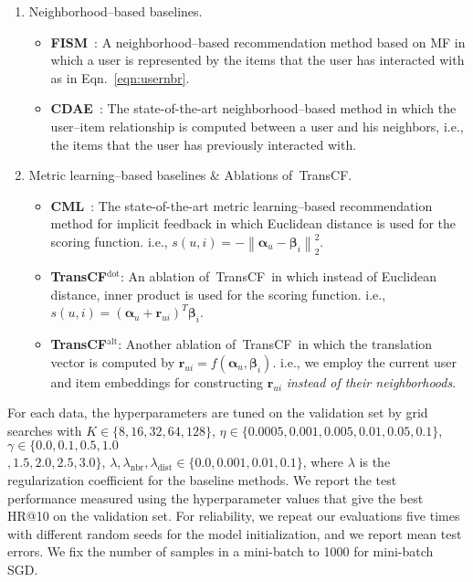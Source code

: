 \documentclass[conference]{IEEEtran}
\newcommand{\norm}[1]{\left\lVert#1\right\rVert}
\newcommand{\propose}{\textsf{{TransCF}}}
\newcommand{\proposealt}{\propose$^{\mathrm{alt}}$}
\newcommand{\proposedot}{\propose$^{\mathrm{dot}}$}
\begin{document}
\begin{enumerate}[leftmargin=0.5cm]
	\item Neighborhood--based baselines.
	\begin{itemize}
		\item \textbf{FISM}~\cite{kabbur2013fism}: A neighborhood--based recommendation method based on MF in which a user is represented by the items that the user has interacted with as in Eqn.~\ref{eqn:usernbr}.
		\item \textbf{CDAE}~\cite{wu2016collaborative}: The state-of-the-art neighborhood--based method in which the user--item relationship is computed between a user and his neighbors, i.e., the items that the user has previously interacted with.
	\end{itemize}
	\item Metric learning--based baselines \& Ablations of~\propose.
	\begin{itemize}
		\item \textbf{CML}~\cite{hsieh2017collaborative}: The state-of-the-art metric learning--based recommendation method for implicit feedback in which Euclidean distance is used for the scoring function. i.e., $s(u,i) = -\norm{\bm{\alpha}_u - {\bm{\beta}_i}}_2^2$.
\item \textbf{\proposedot}: An ablation of~\propose~in which instead of Euclidean distance, inner product is used for the scoring function. i.e., $s(u,i) = (\bm{\alpha}_u + \bm{r}_{ui})^T{\bm{\beta}_i}$.
		\item \textbf{\proposealt}: Another ablation of~\propose~in which the translation vector is computed by $\bm{r}_{ui} = f(\bm{\alpha}_u,  \bm{\beta}_i)$. i.e., we employ the current user and item embeddings for constructing $\bm{r}_{ui}$ \textit{instead of their neighborhoods}. 
	\end{itemize}
\end{enumerate}


\medskip
{}
For each data, the hyperparameters are tuned on the validation set by grid searches with $K\in\{8,16,32,64,128\}$,  $\eta\in\{0.0005,0.001,0.005,0.01,0.05,0.1\}$, $\gamma\in\{0.0,0.1,0.5,1.0$\\$,1.5,2.0,$$2.5,3.0\}$, $\lambda,\lambda_{\mathrm{nbr}},\lambda_{\mathrm{dist}}\in\{0.0,0.001,0.01,0.1\}$, where $\lambda$ is the regularization coefficient for the baseline methods. 
We report the test performance measured using the hyperparameter values that give the best HR@10 on the validation set.
For reliability, we repeat our evaluations five times with different random seeds for the model initialization, and we report mean test errors.
We fix the number of samples in a mini-batch to 1000 for mini-batch SGD.
\end{document}
